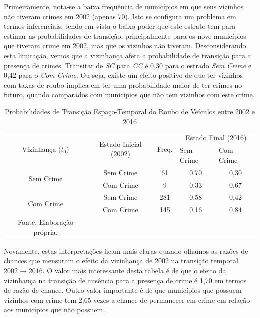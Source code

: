 \documentclass[12pt,openright,oneside,a4paper,english,french,spanish]{abntex2}
\numberwithin{table}{section} %
\numberwithin{figure}{section} %
\begin{document}
Primeiramente, nota-se a baixa frequência de municípios em que seus vizinhos não tiveram crimes em 2002 (apenas 70). Isto se configura um problema em termos inferenciais, tendo em vista o baixo poder que este estrato tem para estimar as probabilidades de transição, principalmente para os nove municípios que tiveram crime em 2002, mas que os vizinhos não tiveram. Desconsiderando esta limitação, vemos que a vizinhança afeta a probabilidade de transição para a presença de crimes. Transitar de \textit{SC} para \textit{CC} é 0,30 para o estrado \textit{Sem Crime} e 0,42 para o \textit{Com Crime}. Ou seja, existe um efeito positivo de que ter vizinhos com taxas de roubo implica em ter uma probabilidade maior de ter crimes no futuro, quando comparados com municípios que não tem vizinhos com este crime.

\begin{table}[H]
\centering
\caption{Probabilidades de Transição Espaço-Temporal do Roubo de Veículos entre 2002 e 2016}
        \begin{tabular}{ccccc}
            \hline
            \multirow{2}{*}{Vizinhança ($t_0$)} & \multirow{2}{*}{Estado Inicial (2002)} & \multirow{2}{*}{Freq.} & \multicolumn{2}{c}{Estado Final (2016)}  \\\cline{4-5} %
                                        & & & \multicolumn{1}{l}{Sem Crime} & \multicolumn{1}{l}{Com Crime} \\\hline
            \multirow{2}{*}{Sem Crime} & {Sem Crime} & 61 &  {0,70} & {0,30} \\
                                       & {Com Crime} & 9 &   {0,33} & {0,67} \\\hline
            \multirow{2}{*}{Com Crime} & {Sem Crime} & 281 & {0,58} & {0,42} \\
                                       & {Com Crime} & 145 & {0,16} & {0,84} \\\hline
            \tiny Fonte: Elaboração própria.
        \end{tabular}
    \label{tab:prob_espaco_tempo_roub_vei_2002_2016}
\end{table}


Novamente, estas interpretações ficam mais claras quando olhamos as razões de chances que mensuram o efeito da vizinhança de 2002 na transição temporal $2002 \rightarrow 2016$. O valor mais interessante desta tabela é de que o efeito da vizinhança na transição de ausência para a presença de crime é 1,70 em termos de razão de chance. Outro valor importante é de que municípios que possuem vizinhos com crime tem 2,65 vezes a chance de permanecer em crime em relação aos municípios que não possuem. 
\end{document}

